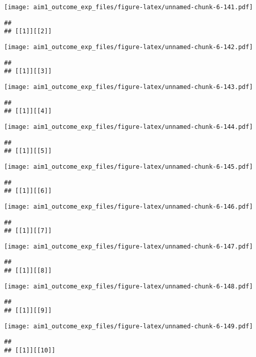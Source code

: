 \documentclass[
]{article}
\begin{document}
\texttt{[image: aim1\_outcome\_exp\_files/figure-latex/unnamed-chunk-6-141.pdf]}

\begin{verbatim}
## 
## [[1]][[2]]
\end{verbatim}

\texttt{[image: aim1\_outcome\_exp\_files/figure-latex/unnamed-chunk-6-142.pdf]}

\begin{verbatim}
## 
## [[1]][[3]]
\end{verbatim}

\texttt{[image: aim1\_outcome\_exp\_files/figure-latex/unnamed-chunk-6-143.pdf]}

\begin{verbatim}
## 
## [[1]][[4]]
\end{verbatim}

\texttt{[image: aim1\_outcome\_exp\_files/figure-latex/unnamed-chunk-6-144.pdf]}

\begin{verbatim}
## 
## [[1]][[5]]
\end{verbatim}

\texttt{[image: aim1\_outcome\_exp\_files/figure-latex/unnamed-chunk-6-145.pdf]}

\begin{verbatim}
## 
## [[1]][[6]]
\end{verbatim}

\texttt{[image: aim1\_outcome\_exp\_files/figure-latex/unnamed-chunk-6-146.pdf]}

\begin{verbatim}
## 
## [[1]][[7]]
\end{verbatim}

\texttt{[image: aim1\_outcome\_exp\_files/figure-latex/unnamed-chunk-6-147.pdf]}

\begin{verbatim}
## 
## [[1]][[8]]
\end{verbatim}

\texttt{[image: aim1\_outcome\_exp\_files/figure-latex/unnamed-chunk-6-148.pdf]}

\begin{verbatim}
## 
## [[1]][[9]]
\end{verbatim}

\texttt{[image: aim1\_outcome\_exp\_files/figure-latex/unnamed-chunk-6-149.pdf]}

\begin{verbatim}
## 
## [[1]][[10]]
\end{verbatim}
\end{document}

